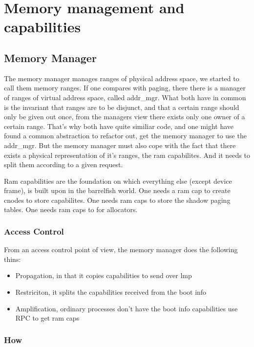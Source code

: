 \chapter{Memory management and capabilities}

\section{Memory Manager}

The memory manager manages ranges of physical address space, we started to call
them memory ranges.
If one compares with paging, there there is a manager of ranges of virtual
address space, called addr\_mgr.
What both have in common is the invariant that ranges are to be disjunct, and
that a certain range should only be given out once, from the managers view there
exists only one owner of a certain range.
That's why both have quite similiar code, and one might have found a common
abstraction to refactor out, get the memory manager to use the addr\_mgr.
But the memory manager must also cope with the fact that there exists a physical
representation of it's ranges, the ram capabilites. And it needs to split them
according to a given request.

Ram capabilities are the foundation on which everything else (except device
frame), is built upon in the barrelfish world.
One needs a ram cap to create cnodes to store capabilites.
One needs ram caps to store the shadow paging tables.
One needs ram caps to for allocators.

\subsection{Access Control}

From an access control point of view, the memory manager does the following thins:
\begin{itemize}
	\item Propagation, in that it copies capabilities to send over lmp
	\item Restriciton, it splits the capabilities received from the boot info
	\item Amplification, ordinary processes don't have the boot info capabilities
		 		use RPC to get ram caps
\end{itemize}

\subsection{How}


